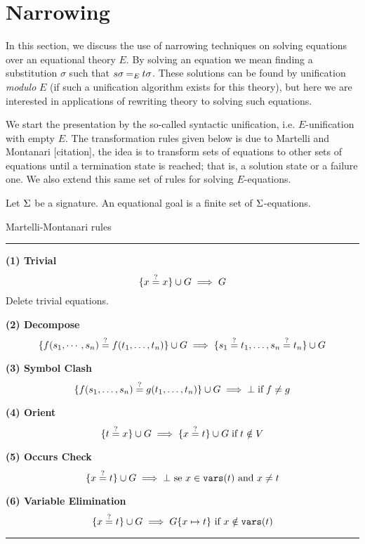 \section{Narrowing}

In this section, we discuss the use of narrowing techniques on solving equations over an equational theory $E$. By solving an equation we mean finding a substitution $\sigma$ such that $s \sigma \mathbin{=_{E}} t\sigma$. These solutions can be found by unification \textit{modulo} $E$ (if such a unification algorithm exists for this theory), but here we are interested in applications of rewriting theory to solving such equations.

We start the presentation by the so-called syntactic unification, i.e. $E$-unification with empty $E$. The transformation rules given below is due to Martelli and Montanari [citation], the idea is to transform sets of equations to other sets of equations until a termination state is reached; that is, a solution state or a failure one. We also extend this same set of rules for solving $E$-equations.

\begin{definition}
	Let $\Sigma$ be a signature. An equational goal is a finite set of $\Sigma$-equations.
\end{definition}

\begin{table}[ht]
	\caption{Martelli-Montanari rules}
	\label{table:unify_inf_rules}
	{\small
		\hrule
		\vspace{10pt}

		\textbf{(1) Trivial}
		$$\{ x\overset{?}{=}x \} \cup G \implies G $$
		Delete trivial equations.

		\textbf{(2) Decompose}
		$$\{f(s_1, \cdots, s_n)\overset{?}{=}f(t_1, \dots, t_n)\} \cup G \implies \{s_1\overset{?}{=}t_1, \dots , s_n\overset{?}{=}t_n \} \cup G$$

		\textbf{(3) Symbol Clash}
		$$\{ f(s_1, \dots, s_n)\overset{?}{=}g(t_1, \dots, t_n) \} \cup G \implies \bot \; \text{if} \; f \neq g $$

		\textbf{(4) Orient}
		$$\{ t\overset{?}{=}x \} \cup G \implies \{ x\overset{?}{=}t \} \cup G \; \text{if} \; t \notin V$$

		\textbf{(5) Occurs Check}
		$$\{ x\overset{?}{=}t \} \cup G \implies \bot \text{ se } x \in \mathtt{vars}(t) \text{ and } x \neq t$$

		\textbf{(6) Variable Elimination}
		$$\{ x\overset{?}{=}t \} \cup G \implies G\{x \mapsto t\} \text{ if } x \notin \mathtt{vars}(t)$$
		\hrule
	}
\end{table}

